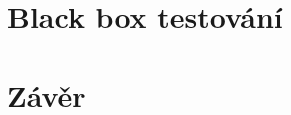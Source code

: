 \documentclass[twoside,twocolumn]{article}
\begin{document}


    \section{Black box testování}



    \section{Závěr}


    \clearpage

    
    

%
%

\end{document}

